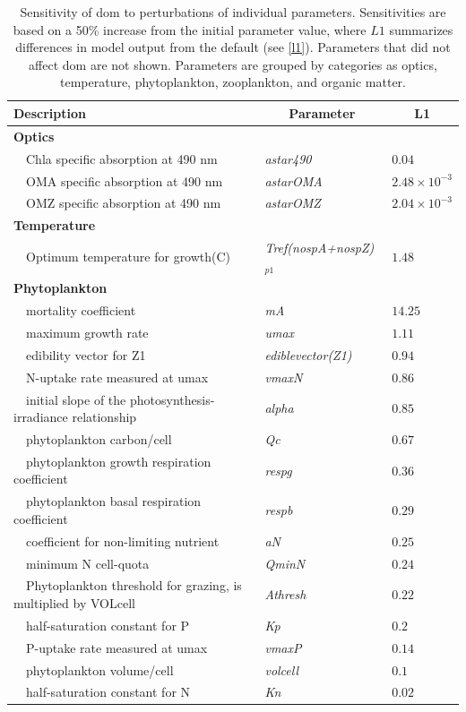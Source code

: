 \documentclass[letterpaper,12pt,oneside]{article}\usepackage[]{graphicx}\usepackage[]{color}
\begin{document}
\begin{table}[!tbp]
{\footnotesize
\caption{Sensitivity of \acl{dom} to perturbations of individual parameters.  Sensitivities are based on a 50\% increase from the initial parameter value, where $L1$ summarizes differences in model output from the default (see \cref{l1}).  Parameters that did not affect \acl{dom} are not shown.  Parameters are grouped by categories as optics, temperature, phytoplankton, zooplankton, and organic matter.\label{tab:om2sens}} 
\begin{center}
\begin{tabular}{lll}
\hline\hline
\multicolumn{1}{l}{Description}&\multicolumn{1}{c}{Parameter}&\multicolumn{1}{c}{L1}\tabularnewline
\hline
{\bfseries Optics}&&\tabularnewline
~~Chla specific absorption at 490 nm&\textit{astar490}&$0.04$\tabularnewline
~~OMA specific absorption at 490 nm&\textit{astarOMA}&$2.48\times 10^{-3}$\tabularnewline
~~OMZ specific absorption at 490 nm&\textit{astarOMZ}&$2.04\times 10^{-3}$\tabularnewline
\hline
{\bfseries Temperature}&&\tabularnewline
~~Optimum temperature for growth(C)&\textit{Tref(nospA+nospZ)$_{p1}$}&$1.48$\tabularnewline
\hline
{\bfseries Phytoplankton}&&\tabularnewline
~~mortality coefficient&\textit{mA}&$14.25$\tabularnewline
~~maximum growth rate&\textit{umax}&$1.11$\tabularnewline
~~edibility vector for Z1&\textit{ediblevector(Z1)}&$0.94$\tabularnewline
~~N-uptake rate measured at umax&\textit{vmaxN}&$0.86$\tabularnewline
~~initial slope of the photosynthesis-irradiance relationship&\textit{alpha}&$0.85$\tabularnewline
~~phytoplankton carbon/cell&\textit{Qc}&$0.67$\tabularnewline
~~phytoplankton growth respiration coefficient&\textit{respg}&$0.36$\tabularnewline
~~phytoplankton basal respiration coefficient&\textit{respb}&$0.29$\tabularnewline
~~coefficient for non-limiting nutrient&\textit{aN}&$0.25$\tabularnewline
~~minimum N cell-quota&\textit{QminN}&$0.24$\tabularnewline
~~Phytoplankton threshold for grazing, is multiplied by VOLcell&\textit{Athresh}&$0.22$\tabularnewline
~~half-saturation constant for P&\textit{Kp}&$0.2$\tabularnewline
~~P-uptake rate measured at umax&\textit{vmaxP}&$0.14$\tabularnewline
~~phytoplankton volume/cell&\textit{volcell}&$0.1$\tabularnewline
~~half-saturation constant for N&\textit{Kn}&$0.02$\tabularnewline

\end{tabular}
\end{center}}
\end{table}
\end{document}
